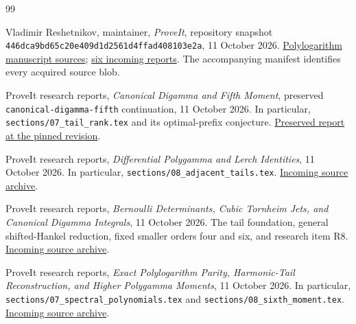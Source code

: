 \begin{thebibliography}{99}
\raggedright
{}

Vladimir Reshetnikov, maintainer,
\emph{ProveIt}, repository snapshot
\texttt{446dca9bd65c20e409d1d2561d4ffad408103e2a},
11 October 2026.
\href{https://github.com/VladimirReshetnikov/ProveIt/tree/446dca9bd65c20e409d1d2561d4ffad408103e2a/Analysis/Polylogarithms/docs/manuscript}{Polylogarithm manuscript sources};
\href{https://github.com/VladimirReshetnikov/ProveIt/tree/446dca9bd65c20e409d1d2561d4ffad408103e2a/docs/incoming}{six incoming reports}.
The accompanying manifest identifies every acquired source blob.

ProveIt research reports,
\emph{Canonical Digamma and Fifth Moment},
preserved \texttt{canonical-digamma-fifth} continuation,
11 October 2026. In particular,
\texttt{sections/07\_tail\_rank.tex} and its optimal-prefix conjecture.
\href{https://github.com/VladimirReshetnikov/ProveIt/tree/446dca9bd65c20e409d1d2561d4ffad408103e2a/Analysis/Polylogarithms/docs/reports/stieltjes-harmonic-resonance/continuations/canonical-digamma-fifth}{Preserved report at the pinned revision}.

ProveIt research reports,
\emph{Differential Polygamma and Lerch Identities},
11 October 2026. In particular,
\texttt{sections/08\_adjacent\_tails.tex}.
\href{https://github.com/VladimirReshetnikov/ProveIt/blob/446dca9bd65c20e409d1d2561d4ffad408103e2a/docs/incoming/ProveIt_Differential_Polygamma_and_Lerch_Jets_2026-10-11.zip}{Incoming source archive}.

ProveIt research reports,
\emph{Bernoulli Determinants, Cubic Tornheim Jets, and Canonical
Digamma Integrals}, 11 October 2026.
The tail foundation, general shifted-Hankel reduction,
fixed smaller orders four and six, and research item R8.
\href{https://github.com/VladimirReshetnikov/ProveIt/blob/446dca9bd65c20e409d1d2561d4ffad408103e2a/docs/incoming/ProveIt_Bernoulli_Tornheim_Digamma_2026-10-11.zip}{Incoming source archive}.

ProveIt research reports,
\emph{Exact Polylogarithm Parity, Harmonic-Tail Reconstruction,
and Higher Polygamma Moments}, 11 October 2026.
In particular, \texttt{sections/07\_spectral\_polynomials.tex}
and \texttt{sections/08\_sixth\_moment.tex}.
\href{https://github.com/VladimirReshetnikov/ProveIt/blob/446dca9bd65c20e409d1d2561d4ffad408103e2a/docs/incoming/ProveIt_Polygamma_Tail_Identities_2026-10-11.zip}{Incoming source archive}.


\end{thebibliography}

